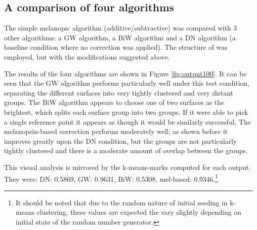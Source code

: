 \clearpage



\subsection{A comparison of four algorithms}

The simple melanopic algorithm (additive/subtractive) was compared with 3 other algorithms: a \gls{GW} algorithm, a \gls{BiW} algorithm and a \gls{DN} algorithm (a baseline condition where no correction was applied). The structure of \citet{barnard_comparison_2002} was employed, but with the modifications suggested above. %


The results of the four algorithms are shown in Figure \ref{fig:output100}. It can be seen that the \gls{GW} algorithm performs particularly well under this test condition, separating the different surfaces into very tightly clustered and very distant groups. The \gls{BiW} algorithm appears to choose one of two surfaces as the brightest, which splits each surface group into two groups. If it were able to pick a single reference point it appears as though it would be similarly successful. The melanopsin-based correction performs moderately well; as shown before it improves greatly upon the \gls{DN} condition, but the groups are not particularly tightly clustered and there is a moderate amount of overlap between the groups.

This visual analysis is mirrored by the k-means-marks computed for each output. They were: \gls{DN}: 0.5869, \gls{GW}: 0.9631, \gls{BiW}: 0.5308, mel-based: 0.9346.\footnote{It should be noted that due to the random nature of initial seeding in k-means clustering, these values are expected the vary slightly depending on initial state of the random number generator.}

